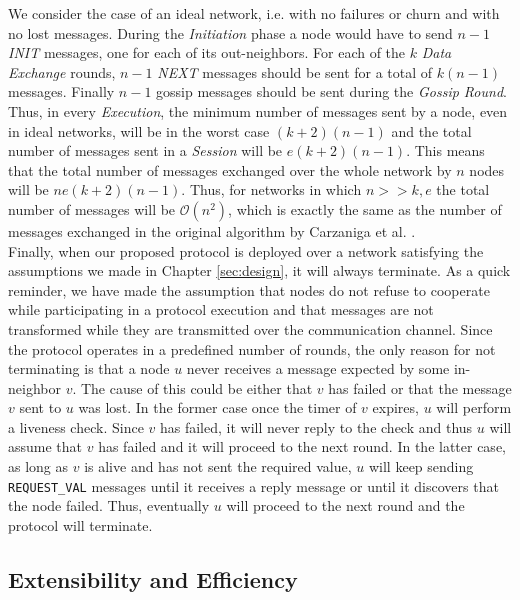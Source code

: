 \documentclass[a4paper,11pt,twoside]{report}
\newcommand{\classname}[1]{\texttt{#1}}
\begin{document}
We consider the case of an ideal network, i.e. with no failures or churn and with no lost messages. During the \textit{Initiation} phase a node would have to send $n-1$ \textit{INIT} messages, one for each of its out-neighbors. For each of the $k$ \textit{Data Exchange} rounds, $n-1$ \textit{NEXT} messages should be sent for a total of $k(n-1)$ messages. Finally $n-1$ gossip messages should be sent during the \textit{Gossip Round}. Thus, in every \textit{Execution}, the minimum number of messages sent by a node, even in ideal networks, will be in the worst case $(k+2)(n-1)$ and the total number of messages sent in a \textit{Session} will be $ e(k+2)(n-1)$. This means that the total number of messages exchanged over the whole network by $n$ nodes will be $ne(k+2)(n-1)$. Thus, for networks in which $n >> k,e$ the total number of messages will be $\mathcal{O}(n^2)$, which is exactly the same as the number of messages exchanged in the original algorithm by Carzaniga et al. \cite{6195806}.\\

Finally, when our proposed protocol is deployed over a network satisfying the assumptions we made in Chapter \ref{sec:design}, it will always terminate. As a quick reminder, we have made the assumption that nodes do not refuse to cooperate while participating in a protocol execution and that messages are not transformed while they are transmitted over the communication channel. Since the protocol operates in a predefined number of rounds, the only reason for not terminating is that a node $u$ never receives a message expected by some in-neighbor $v$. The cause of this could be either that $v$ has failed or that the message $v$ sent to $u$ was lost. In the former case once the timer of $v$ expires, $u$ will perform a liveness check. Since $v$ has failed, it will never reply to the check and thus $u$ will assume that $v$ has failed and it will proceed to the next round. In the latter case, as long as $v$ is alive and has not sent the required value, $u$ will keep sending \classname{REQUEST\_VAL} messages until it receives a reply message or until it discovers that the node failed. Thus, eventually $u$ will proceed to the next round and the protocol will terminate.

\subsection{Extensibility and Efficiency}
\end{document}
